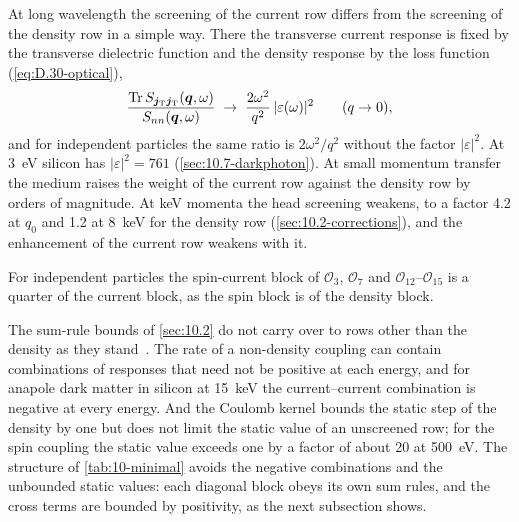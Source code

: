 At long wavelength the screening of the current row differs from the screening of the density row in a simple way. There the transverse current response is fixed by the transverse dielectric function and the density response by the loss function (\cref{eq:D.30-optical}),
\begin{equation}
  \frac{\operatorname{Tr} S_{\bm{j}_{\mathrm{T}}\bm{j}_{\mathrm{T}}}(\bm{q},\omega)}{S_{nn}(\bm{q},\omega)} \;\to\; \frac{2\omega^2}{q^2}\,|\varepsilon(\omega)|^2 \qquad (q \to 0) ,
  \label{eq:10.4-optical}
\end{equation}
and for independent particles the same ratio is $2\omega^2/q^2$ without the factor $|\varepsilon|^2$. At \SI{3}{eV} silicon has $|\varepsilon|^2 = 761$ (\cref{sec:10.7-darkphoton}). At small momentum transfer the medium raises the weight of the current row against the density row by orders of magnitude. At keV momenta the head screening weakens, to a factor 4.2 at $q_0$ and 1.2 at \SI{8}{keV} for the density row (\cref{sec:10.2-corrections}), and the enhancement of the current row weakens with it.

For independent particles the spin-current block of $\mathcal{O}_3$, $\mathcal{O}_7$ and $\mathcal{O}_{12}$--$\mathcal{O}_{15}$ is a quarter of the current block, as the spin block is of the density block.

The sum-rule bounds of \cref{sec:10.2} do not carry over to rows other than the density as they stand~\cite[Eqs.~(4.16)--(4.21)]{catena2025general}. The rate of a non-density coupling can contain combinations of responses that need not be positive at each energy, and for anapole dark matter in silicon at \SI{15}{keV} the current--current combination is negative at every energy. And the Coulomb kernel bounds the static step of the density by one but does not limit the static value of an unscreened row; for the spin coupling the static value exceeds one by a factor of about 20 at \SI{500}{eV}. The structure of \cref{tab:10-minimal} avoids the negative combinations and the unbounded static values: each diagonal block obeys its own sum rules, and the cross terms are bounded by positivity, as the next subsection shows.

